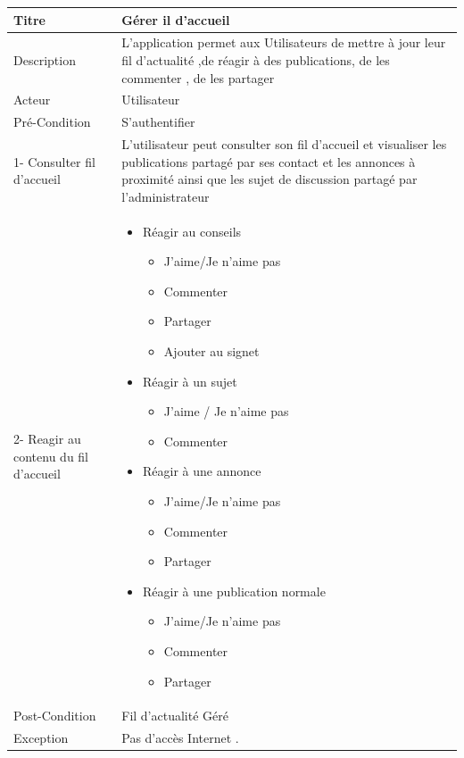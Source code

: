 \documentclass[11pt,a4paper,oneside]{book}
\begin{document}
		\begin{tabular}{ |p{3cm}|p{10cm}|  }
			
			\hline
			Titre&  Gérer il d'accueil\\
			\hline
			Description  & L’application permet aux Utilisateurs de mettre à jour leur fil d’actualité ,de réagir à des publications, de les commenter , de les partager\\
			\hline
			Acteur&Utilisateur\\
			\hline
			Pré-Condition & S'authentifier 
			\\
			\hline
			1- Consulter fil d'accueil & L’utilisateur peut consulter son fil d’accueil et visualiser les publications partagé par ses contact et les annonces à proximité ainsi que les sujet de discussion partagé par l’administrateur\\
			
			2- Reagir au contenu du fil d'accueil & 
			\begin{itemize} 
				\item Réagir au conseils
				\begin{itemize}
					\item J’aime/Je n’aime pas
					\item Commenter
					\item Partager
					\item Ajouter au signet 
				\end{itemize}
				\item Réagir à un sujet 
				\begin{itemize}
					\item J'aime / Je n'aime pas 
					\item Commenter
				\end{itemize}
				\item Réagir à une annonce
				\begin{itemize}
					\item J’aime/Je n’aime pas
					\item Commenter
					\item Partager
				\end{itemize}
				\item Réagir à une publication normale
				\begin{itemize}
					\item J’aime/Je n’aime pas
					\item Commenter
					\item Partager
				\end{itemize}
				\end {itemize} \\
				\hline
				Post-Condition& Fil d'actualité Géré\\
				\hline
				Exception& Pas d'accès Internet . \\
				\hline
			\end{tabular}
			
\end{document}
